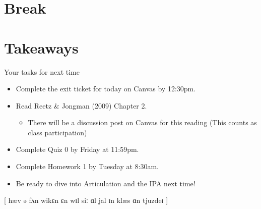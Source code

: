 \documentclass[professionalfonts]{beamer}
\begin{document}
\section*{Break}



\section*{Takeaways}
\begin{frame}{Your tasks for next time}
    \begin{itemize}
        \item Complete the exit ticket for today on Canvas by 12:30pm.
        \item Read Reetz \& Jongman (2009) Chapter 2.
        \begin{itemize}
            \item There will be a discussion post on Canvas for this reading (This counts as class participation)
        \end{itemize}
        \item Complete Quiz 0 by Friday at 11:59pm.
        \item Complete Homework 1 by Tuesday at 8:30am.
        \item Be ready to dive into Articulation and the IPA next time!
    \end{itemize}
\end{frame}

\begin{frame}
    \begin{center}
        [ hæv ə fʌn wikɛn ɛn wɪl siː ɑl jal ɪn klæs ɑn tjuzdeɪ ]
    \end{center}
\end{frame}

\end{document}
